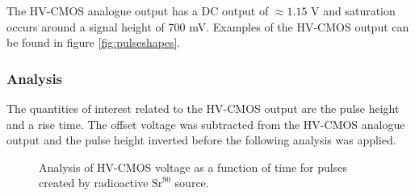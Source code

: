 The HV-CMOS analogue output has a DC output of $\approx 1.15$ V and saturation occurs around a signal height of 700 mV.  Examples of the HV-CMOS output can be found in figure \ref{fig:pulseshapes}.

\subsubsection{Analysis}
The quantities of interest related to the HV-CMOS output are the pulse height and a rise time.  The offset voltage was subtracted from the HV-CMOS analogue output and the pulse height inverted before the following analysis was applied.

\begin{figure}
\centering
{}
\hfill
\caption[Analysis of HV-CMOS voltage as a function of time for pulses created by radioactive strontium 90 source.]{Analysis of HV-CMOS voltage as a function of time for pulses created by radioactive $\text{Sr}^{90}$ source.}
\label{fig:pulseshapeanalysis}
\end{figure}

